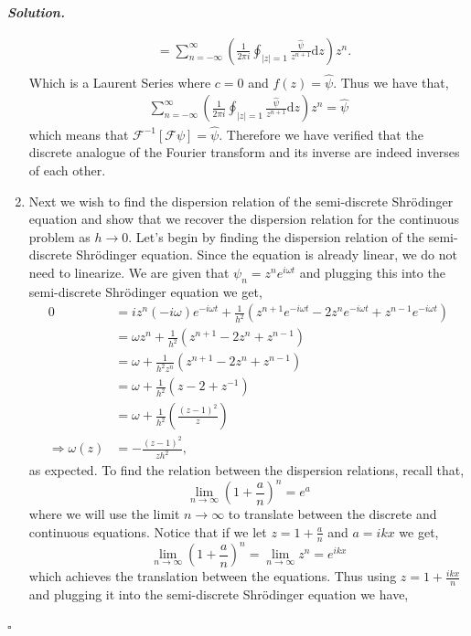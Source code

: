 \documentclass[12pt]{report}
\newenvironment{solution}[1][\it{Solution}]{\textbf{#1. } }{$\square$}
\begin{document}
\begin{solution}
\begin{enumerate}
\begin{align*}
            &=\sum_{n=-\infty}^\infty\left(\frac{1}{2\pi i}\oint_{|z|=1}\frac{\hat{\psi}}{z^{n+1}}\mathrm{d}z\right)z^n.\\
        \end{align*}
        Which is a Laurent Series where $c = 0$ and $f(z) = \hat{\psi}$. Thus we have that,
        \begin{align*}
            \sum_{n=-\infty}^\infty\left(\frac{1}{2\pi i}\oint_{|z|=1}\frac{\hat{\psi}}{z^{n+1}}\mathrm{d}z\right)z^n = \hat{\psi}
        \end{align*}
        which means that $\mathcal{F}^{-1}[\mathcal{F}\psi]=\hat{\psi}$. Therefore we have verified that the discrete analogue of the Fourier transform and its inverse are indeed inverses of each other.

        \item Next we wish to find the dispersion relation of the semi-discrete Shr\"odinger equation and show that we recover the dispersion relation for the continuous problem as $h \rightarrow 0$. Let's begin by finding the dispersion relation of the semi-discrete Shr\"odinger equation. Since the equation is already linear, we do not need to linearize. We are given that $\psi_n = z^n e^{i\omega t}$ and plugging this into the semi-discrete Shr\"odinger equation we get,
        \begin{align*}
            0 &= iz^n(-i\omega)e^{-i\omega t}+\frac{1}{h^2}(z^{n+1}e^{-i\omega t}-2z^ne^{-i\omega t}+z^{n-1}e^{-i\omega t})\\
            &=\omega z^n+\frac{1}{h^2}(z^{n+1}-2z^n+z^{n-1})\\
            &=\omega+\frac{1}{h^2z^n}(z^{n+1}-2z^n+z^{n-1})\\
            &=\omega+\frac{1}{h^2}(z-2+z^{-1})\\
            &=\omega+\frac{1}{h^2}\left(\frac{(z-1)^2}{z}\right)\\
            \Rightarrow \omega(z) &=-\frac{(z-1)^2}{zh^2},
        \end{align*}
        as expected. To find the relation between the dispersion relations, recall that,
        \[
            \lim_{n\rightarrow\infty}\left( 1 + \frac{a}{n}\right)^n = e^a
        \]
        where we will use the limit $n \rightarrow \infty$ to translate between the discrete and continuous equations. Notice that if we let $z = 1 + \frac{a}{n}$ and $a = ikx$ we get,
        \[
            \lim_{n\rightarrow\infty}\left( 1 + \frac{a}{n}\right)^n = \lim_{n \rightarrow \infty}z^n = e^{ikx}
        \] 
        which achieves the translation between the equations. Thus using $z = 1 + \frac{ikx}{n}$ and plugging it into the semi-discrete Shr\"odinger equation we have,

\end{enumerate}
\end{solution}
\end{document}
